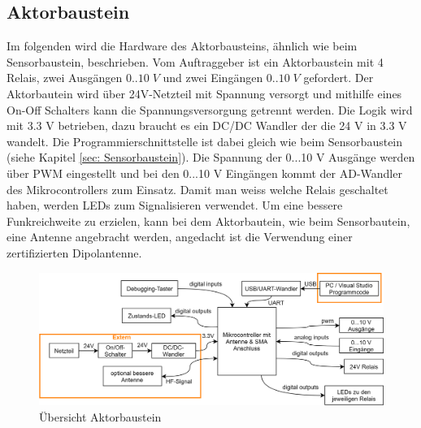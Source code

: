 \subsection{Aktorbaustein}\label{subsec: Aktorbaustein}
Im folgenden wird die Hardware des Aktorbausteins, ähnlich wie beim Sensorbaustein, beschrieben. Vom Auftraggeber ist ein Aktorbaustein mit 4 Relais, zwei Ausgängen $0..10\;V$ und zwei Eingängen $0..10\;V$ gefordert. Der Aktorbautein wird über 24V-Netzteil mit Spannung versorgt und mithilfe eines On-Off Schalters kann die Spannungsversorgung getrennt werden. Die Logik wird mit 3.3 V betrieben, dazu braucht es ein DC/DC Wandler der die 24 V in 3.3 V wandelt. Die Programmierschnittstelle ist dabei gleich wie beim Sensorbaustein (siehe Kapitel \ref{sec: Sensorbaustein}). Die Spannung der  0...10 V Ausgänge werden über PWM eingestellt und bei den 0...10 V Eingängen kommt der AD-Wandler des Mikrocontrollers zum Einsatz. Damit man weiss welche Relais geschaltet haben, werden LEDs zum Signalisieren verwendet. Um eine bessere Funkreichweite zu erzielen, kann bei dem Aktorbautein, wie beim Sensorbautein, eine Antenne angebracht werden, angedacht ist die Verwendung einer zertifizierten Dipolantenne.

\begin{figure}[h!]
	\centering
	\includegraphics[width=\textwidth]{graphics/Aktorbaustein.png}
	\caption{Übersicht Aktorbaustein}
	\label{pic: Uebersicht_Aktorbaustein}
\end{figure} 

